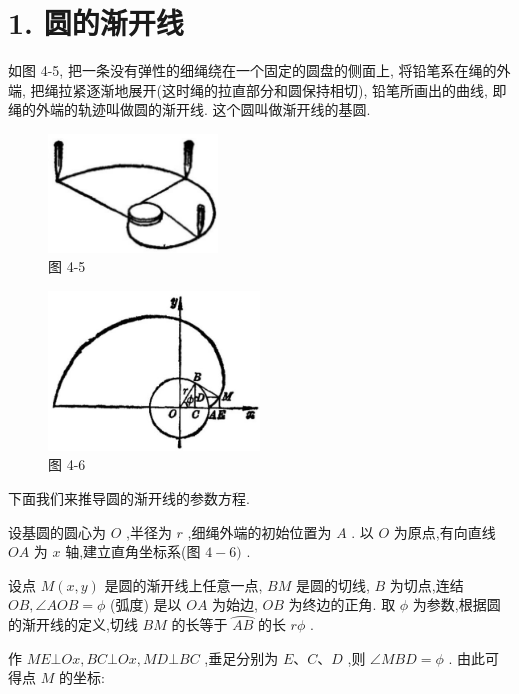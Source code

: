 \documentclass[lang=cn,newtx,12pt,scheme=chinese]{elegantbook}
\begin{document}
\section*{1. 圆的渐开线}

如图 4-5, 把一条没有弹性的细绳绕在一个固定的圆盘的侧面上, 将铅笔系在绳的外端, 把绳拉紧逐渐地展开(这时绳的拉直部分和圆保持相切), 铅笔所画出的曲线, 即绳的外端的轨迹叫做圆的渐开线. 这个圆叫做渐开线的基圆.

\begin{figure}[h]
  \centering
  \includegraphics[max width=0.4\textwidth]{images/01912cc2-ffb6-728e-9ae7-b113ff05c64b_167_188524.jpg}
  \caption{图 4-5}
\end{figure}

\begin{figure}[h]
  \centering
  \includegraphics[max width=0.5\textwidth]{images/01912cc2-ffb6-728e-9ae7-b113ff05c64b_167_197390.jpg}
  \caption{图 4-6}
\end{figure}

下面我们来推导圆的渐开线的参数方程.

设基圆的圆心为 \(O\) ,半径为 \(r\) ,细绳外端的初始位置为 \(A\) . 以 \(O\) 为原点,有向直线 \({OA}\) 为 \(x\) 轴,建立直角坐标系(图 \(4 - 6)\) .

设点 \(M\left( {x,y}\right)\) 是圆的渐开线上任意一点, \({BM}\) 是圆的切线, \(B\) 为切点,连结 \({OB},\angle {AOB} = \phi\) (弧度) 是以 \({OA}\) 为始边, \({OB}\) 为终边的正角. 取 \(\phi\) 为参数,根据圆的渐开线的定义,切线 \({BM}\) 的长等于 \(\overset{⏜}{AB}\) 的长 \({r\phi }\) .

作 \({ME} \bot {Ox},{BC} \bot {Ox},{MD} \bot {BC}\) ,垂足分别为 \(E\text{、}C\text{、}D\) ,则 \(\angle {MBD} = \phi\) . 由此可得点 \(M\) 的坐标:
\end{document}
